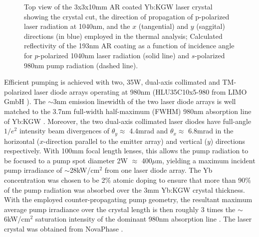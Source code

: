 \begin{figure}
  \subfloat[][]{
    \label{fig:crystal_geo}
    
  }
  \caption[Laser crystal and anti-reflection coating]{
    \protect{} Top view of the 3x3x10mm AR coated Yb:KGW laser crystal showing the crystal cut, the direction of propagation of p-polarized laser radiation at 1040nm, and the $x$ (tangential) and $y$ (saggital) directions (in blue) employed in the thermal analysis;
    \protect{} Calculated reflectivity of the 193nm  AR coating as a function of incidence angle for $p$-polarized 1040nm laser radiation (solid line) and $s$-polarized 980nm pump radiation (dashed line).
  }
  \label{fig:crystal}
\end{figure}

Efficient pumping is achieved with two, 35W, dual-axis collimated and TM-polarized laser diode arrays operating at 980nm (HLU35C10x5-980 from LIMO GmbH \cite{website_limo}).
The $\sim$3nm emission linewidth of the two laser diode arrays is well matched to the 3.7nm full-width half-maximum (FWHM) 980nm absorption line of Yb:KGW \cite{Paunescu_diode_2004,Biswal_thermo_optical_05,website_EKSPLA}.
Moreover, the two dual-axis collimated laser diodes have full-angle $1/e^2$ intensity beam divergences of $\theta_y \approx$ 4.4mrad and $\theta_x \approx$ 6.8mrad in the horizontal ($x$-direction parallel to the emitter array) and vertical ($y$) directions respectively. 
With 100mm focal length lenses, this allows the pump radiation to be focused to a pump spot diameter 2W $\approx$ 400$\mu$m, yielding a maximum incident pump irradiance of $\sim$28kW/cm$^2$ from one laser diode array.
The Yb concentration was chosen to be 2\% atomic doping to ensure that more than 90\% of the pump radiation was absorbed over the 3mm Yb:KGW crystal thickness.
With the employed counter-propagating pump geometry, the resultant maximum average pump irradiance over the crystal length is then roughly 3 times the $\sim$6kW/cm$^2$ saturation intensity of the dominant 980nm absorption line \cite{Brunner_powerful_2004}.
The laser crystal was obtained from NovaPhase \cite{website_nova}.

